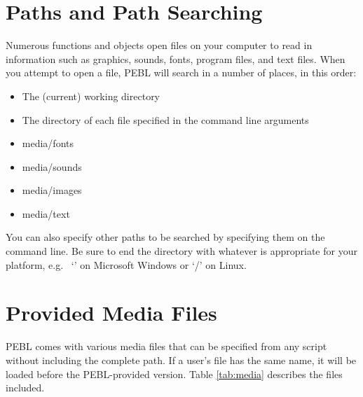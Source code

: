 \section{Paths and Path Searching}

Numerous functions and objects open files on your computer to read in
information such as graphics, sounds, fonts, program files, and text files.  When you attempt to open a file, PEBL will search in a number of places, 
in this order:
\begin{itemize}
\item
The (current) working directory
\item
The directory of each file specified in the command line arguments
\item
media/fonts
\item
media/sounds
\item
media/images
\item
media/text
\end{itemize}
  
You can also specify other paths to be searched by specifying them on the command line.  Be sure to end the directory with whatever is appropriate for your platform, e.g.~ `' on Microsoft Windows or `/' on Linux.

\section{Provided Media Files}
\label{sec:media}

PEBL comes with various media files that can be specified from 
any script without including the complete path.  If a user's file has
the same name, it will be loaded before the PEBL-provided version.
Table \ref{tab:media} describes the files included.
\vspace{1cm}

